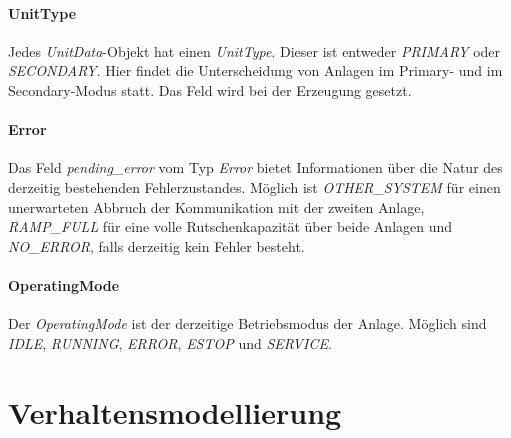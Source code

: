 \paragraph{UnitType}
Jedes \textit{UnitData}-Objekt hat einen \textit{UnitType}. Dieser ist entweder \textit{PRIMARY} oder
\textit{SECONDARY}.
Hier findet die Unterscheidung von Anlagen im Primary- und im Secondary-Modus statt.
Das Feld wird bei der Erzeugung gesetzt.

\paragraph{Error}
Das Feld \textit{pending\_error} vom Typ \textit{Error} bietet Informationen über die Natur des derzeitig
bestehenden Fehlerzustandes. Möglich ist \textit{OTHER\_SYSTEM} für einen unerwarteten Abbruch der Kommunikation
mit der zweiten Anlage, \textit{RAMP\_FULL} für eine volle Rutschenkapazität über beide Anlagen und \textit{NO\_ERROR},
falls derzeitig kein Fehler besteht.

\paragraph{OperatingMode}
Der \textit{OperatingMode} ist der derzeitige Betriebsmodus der Anlage.
Möglich sind \textit{IDLE}, \textit{RUNNING}, \textit{ERROR}, \textit{ESTOP} und \textit{SERVICE}.






\FloatBarrier
\section{Verhaltensmodellierung}\label{sec:verhaltensmodellierung}

